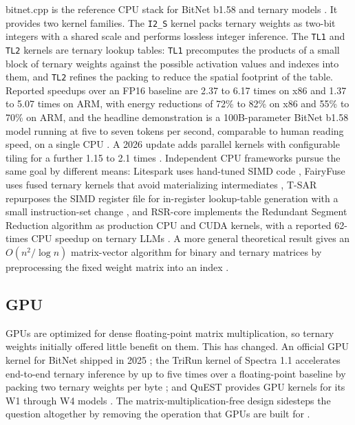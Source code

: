 \documentclass[11pt]{article}
\begin{document}
bitnet.cpp is the reference CPU stack for BitNet b1.58 and ternary models
\cite{Wang2024-1bitAIInfra,Wang2025-BitNetCPP}. It provides two kernel families. The \texttt{I2\_S}
kernel packs ternary weights as two-bit integers with a shared scale and performs
lossless integer inference. The \texttt{TL1} and \texttt{TL2} kernels are ternary lookup tables: \texttt{TL1}
precomputes the products of a small block of ternary weights against the possible
activation values and indexes into them, and \texttt{TL2} refines the packing to reduce the
spatial footprint of the table. Reported speedups over an FP16 baseline are 2.37 to 6.17
times on x86 and 1.37 to 5.07 times on ARM, with energy reductions of 72\% to 82\% on
x86 and 55\% to 70\% on ARM, and the headline demonstration is a 100B-parameter BitNet
b1.58 model running at five to seven tokens per second, comparable to human reading
speed, on a single CPU \cite{Wang2024-1bitAIInfra}. A 2026 update adds parallel kernels with
configurable tiling for a further 1.15 to 2.1 times \cite{web-microsoftBitNet}. Independent
CPU frameworks pursue the same goal by different means: Litespark uses hand-tuned SIMD
code \cite{Anon2026-Litespark}, FairyFuse uses fused ternary kernels that avoid materializing
intermediates \cite{Zuo2026-FairyFuse}, T-SAR repurposes the SIMD register file for
in-register lookup-table generation with a small instruction-set change \cite{Oh2025-TSAR},
and RSR-core implements the Redundant Segment Reduction algorithm as production CPU and
CUDA kernels, with a reported 62-times CPU speedup on ternary LLMs
\cite{Dehghankar2026-RSRcore}. A more general theoretical result gives an
$O(n^2 / \log n)$ matrix-vector algorithm for binary and ternary matrices by
preprocessing the fixed weight matrix into an index \cite{Dehghankar2024-EfficientMatmul}.

\subsection{GPU}

GPUs are optimized for dense floating-point matrix multiplication, so ternary weights
initially offered little benefit on them. This has changed. An official GPU kernel for
BitNet shipped in 2025 \cite{web-microsoftBitNet}; the TriRun kernel of Spectra 1.1
accelerates end-to-end ternary inference by up to five times over a floating-point
baseline by packing two ternary weights per byte \cite{Vaidhya2025-Spectra11}; and QuEST
provides GPU kernels for its W1 through W4 models \cite{Panferov2025-QuEST}. The
matrix-multiplication-free design sidesteps the question altogether by removing the
operation that GPUs are built for \cite{Zhu2024-MatmulFree}.
\end{document}
